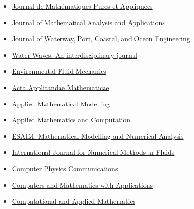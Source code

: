 \documentclass[final, a4paper, oneside, 12pt]{article}
\numberwithin{equation}{section}
\begin{document}
\begin{itemize}
    \item \href{http://www.journals.elsevier.com/journal-de-mathematiques-pures-et-appliquees/}%
    {Journal de Math\'ematiques Pures et Appliqu\'ees}

    \item \href{https://www.sciencedirect.com/journal/journal-of-mathematical-analysis-and-applications/}%
    {Journal of Mathematical Analysis and Applications}
    
    \item \href{http://ascelibrary.org/wwo/}%
    {Journal of Waterway, Port, Coastal, and Ocean Engineering}

    \item \href{https://link.springer.com/journal/42286/}%
    {Water Waves: An interdisciplinary journal}

    \item \href{https://link.springer.com/journal/10652/}%
    {Environmental Fluid Mechanics}

    \item \href{https://link.springer.com/journal/10440/}%
    {Acta Applicandae Mathematicae}
    
    \item \href{http://www.journals.elsevier.com/applied-mathematical-modelling/}%
    {Applied Mathematical Modelling}
    
    \item \href{http://www.journals.elsevier.com/applied-mathematics-and-computation/}%
    {Applied Mathematics and Computation}

    \item \href{https://www.esaim-m2an.org/}%
    {ESAIM: Mathematical Modelling and Numerical Analysis}

    \item \href{https://onlinelibrary.wiley.com/journal/10970363/}%
    {International Journal for Numerical Methods in Fluids}
    
    \item \href{https://www.journals.elsevier.com/computer-physics-communications}%
    {Computer Physics Communications}
    
    \item \href{http://www.journals.elsevier.com/computers-and-mathematics-with-applications/}%
    {Computers and Mathematics with Applications}
    
    \item \href{https://link.springer.com/journal/40314/}%
    {Computational and Applied Mathematics}
    

\end{itemize}
\end{document}
